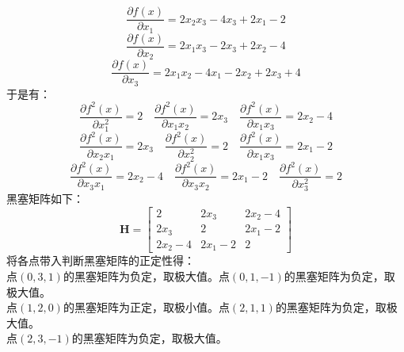 \documentclass[12pt]{article}
\begin{document}
\section{}
\noindent
\[\frac{\partial f(x)}{\partial x_1}=2x_2x_3-4x_3+2x_1-2\]
\[\frac{\partial f(x)}{\partial x_2}=2x_1x_3-2x_3+2x_2-4\]
\[\frac{\partial f(x)}{\partial x_3}=2x_1x_2-4x_1-2x_2+2x_3+4\]
于是有：
\[\frac{\partial f^2(x)}{\partial x_1^2}=2 \quad \frac{\partial f^2(x)}{\partial x_1x_2}=2x_3 \quad \frac{\partial f^2(x)}{\partial x_1x_3}=2x_2-4\]
\[\frac{\partial f^2(x)}{\partial x_2x_1}=2x_3 \quad \frac{\partial f^2(x)}{\partial x_2^2}=2 \quad \frac{\partial f^2(x)}{\partial x_1x_3}=2x_1-2\]
\[\frac{\partial f^2(x)}{\partial x_3x_1}=2x_2-4 \quad \frac{\partial f^2(x)}{\partial x_3x_2}=2x_1-2 \quad \frac{\partial f^2(x)}{\partial x_3^2}=2\]
黑塞矩阵如下：
\[\boldsymbol{H}=\begin{bmatrix}
    2 & 2x_3 & 2x_2-4 \\
    2x_3 & 2 & 2x_1-2 \\
    2x_2-4 & 2x_1-2 & 2
\end{bmatrix}\]
将各点带入判断黑塞矩阵的正定性得：\\
点$(0,3,1)$的黑塞矩阵为负定，取极大值。点$(0,1,-1)$的黑塞矩阵为负定，取极大值。\\
点$(1,2,0)$的黑塞矩阵为正定，取极小值。点$(2,1,1)$的黑塞矩阵为负定，取极大值。\\
点$(2,3,-1)$的黑塞矩阵为负定，取极大值。
\end{document}
